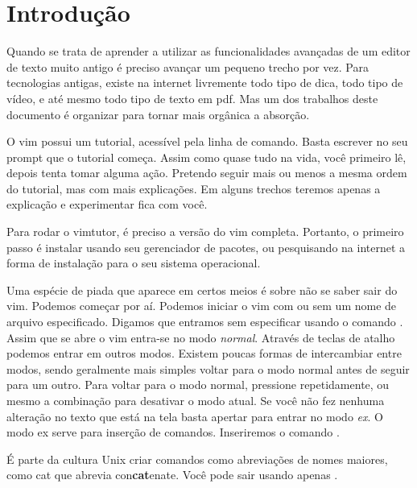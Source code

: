 \chapter{Introdução}
Quando se trata de aprender a utilizar as funcionalidades avançadas de um editor de texto muito
antigo é preciso avançar um pequeno trecho por vez.
Para tecnologias antigas, existe na internet livremente todo tipo de dica,
todo tipo de vídeo, e até mesmo todo tipo de texto em pdf.
Mas um dos trabalhos deste documento é organizar para tornar mais orgânica a absorção.

O vim possui um tutorial, acessível pela linha de comando.
Basta escrever no seu prompt  que o tutorial começa.
Assim como quase tudo na vida, você primeiro lê, depois tenta tomar alguma ação.
Pretendo seguir mais ou menos a mesma ordem do tutorial, mas com mais explicações.
Em alguns trechos teremos apenas a explicação e experimentar fica com você.

Para rodar o vimtutor, é preciso a versão do vim completa.
Portanto, o primeiro passo é instalar usando seu gerenciador de pacotes,
ou pesquisando na internet a forma de instalação para o seu sistema operacional.


Uma espécie de piada que aparece em certos meios é sobre não se saber sair do vim.
Podemos começar por aí.
Podemos iniciar o vim com ou sem um nome de arquivo especificado.
Digamos que entramos sem especificar usando o comando .
Assim que se abre o vim entra-se no modo \emph{normal}.
Através de teclas de atalho podemos entrar em outros modos.
Existem poucas formas de intercambiar entre modos, sendo geralmente mais simples voltar
para o modo normal antes de seguir para um outro.
Para voltar para o modo normal, pressione  repetidamente,
ou mesmo a combinação  para desativar o modo atual.
Se você não fez nenhuma alteração no texto que está na tela
basta apertar \vimcommand{:} para entrar no modo \emph{ex}.
O modo ex serve para inserção de comandos.
Inseriremos o comando .


É parte da cultura Unix criar comandos como abreviações de nomes maiores,
como cat que abrevia con\textbf{cat}enate.
Você pode sair usando apenas .

